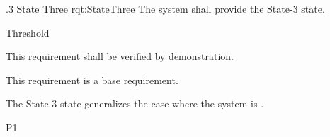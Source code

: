 \ONERQMTV
{\RqtNumberBase.3}
{State Three}
{rqt:StateThree}
{The system shall provide the State-3 state.}
{
	\item [Phase 1] Threshold
}
{This requirement shall be verified by demonstration.}
{
	\item [N/A] This requirement is a base requirement.
}
{
	\item The State-3 state generalizes the case where the system is \TBD.
}
{P1}
